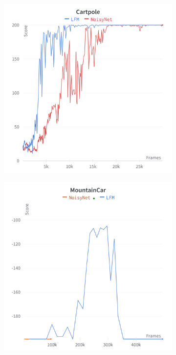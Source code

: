 \documentclass[]{uai2022} %
\begin{document}
\begin{figure}
    \centering
    \begin{subfigure}[b]{0.45\columnwidth}
        \centering
        \includegraphics[width=\columnwidth]{charts/Cartpole_score}
    \end{subfigure}
    \begin{subfigure}[b]{0.45\columnwidth}
        \centering
        \includegraphics[width=\columnwidth]{charts/MountainCar_score}

\end{subfigure}
\end{figure}
\end{document}
